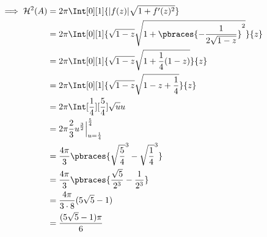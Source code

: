 \begin{solution}
\begin{align*}
    \implies
    \mathcal{H}^2(A)
    & =
    2 \pi
    \Int[0][1]
    {
        |f(z)|
        \sqrt{1 + f^\prime(z)^2}
    } \\
    & =
    2 \pi
    \Int[0][1]
    {
        \sqrt{1 - z}
        \sqrt
        {
            1
            +
            \pbraces
            {
                -\frac{1}{2 \sqrt{1 - z}}
            }^2
        }
    }{z} \\
    & =
    2 \pi
    \Int[0][1]
    {
        \sqrt{1 - z}
        \sqrt
        {
            1
            +
            \frac{1}{4}
            (1 - z)
        }
    }{z} \\
    & =
    2 \pi
    \Int[0][1]
    {
        \sqrt{1 - z}
        \sqrt
        {
            1 - z + \frac{1}{4}
        }
    }{z} \\
    & =
    2 \pi
    \Int[\frac{1}{4}][\frac{5}{4}]{\sqrt u}{u} \\
    & =
    2 \pi
    \frac{2}{3}
    u^\frac{3}{2} \Big |_{u = \frac{1}{4}}^\frac{5}{4} \\
    & =
    \frac{4 \pi}{3}
    \pbraces
    {
        \sqrt{\frac{5}{4}}^3
        -
        \sqrt{\frac{1}{4}}^3
    } \\
    & =
    \frac{4 \pi}{3}
    \pbraces
    {
        \frac{\sqrt{5}}{2^3}
        -
        \frac{1}{2^3}
    } \\
    & =
    \frac{4 \pi}{3 \cdot 8}
    (5 \sqrt 5 - 1) \\
    & =
    \frac{(5 \sqrt 5 - 1) \pi}{6}
\end{align*}

\end{solution}

